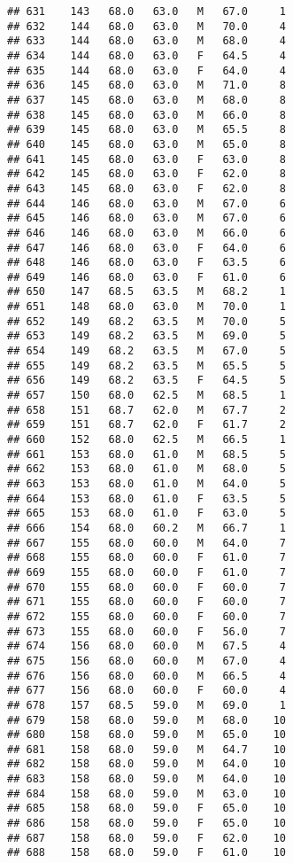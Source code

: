 \documentclass[
]{article}
\begin{document}
\begin{verbatim}
## 631    143   68.0   63.0   M   67.0     1
## 632    144   68.0   63.0   M   70.0     4
## 633    144   68.0   63.0   M   68.0     4
## 634    144   68.0   63.0   F   64.5     4
## 635    144   68.0   63.0   F   64.0     4
## 636    145   68.0   63.0   M   71.0     8
## 637    145   68.0   63.0   M   68.0     8
## 638    145   68.0   63.0   M   66.0     8
## 639    145   68.0   63.0   M   65.5     8
## 640    145   68.0   63.0   M   65.0     8
## 641    145   68.0   63.0   F   63.0     8
## 642    145   68.0   63.0   F   62.0     8
## 643    145   68.0   63.0   F   62.0     8
## 644    146   68.0   63.0   M   67.0     6
## 645    146   68.0   63.0   M   67.0     6
## 646    146   68.0   63.0   M   66.0     6
## 647    146   68.0   63.0   F   64.0     6
## 648    146   68.0   63.0   F   63.5     6
## 649    146   68.0   63.0   F   61.0     6
## 650    147   68.5   63.5   M   68.2     1
## 651    148   68.0   63.0   M   70.0     1
## 652    149   68.2   63.5   M   70.0     5
## 653    149   68.2   63.5   M   69.0     5
## 654    149   68.2   63.5   M   67.0     5
## 655    149   68.2   63.5   M   65.5     5
## 656    149   68.2   63.5   F   64.5     5
## 657    150   68.0   62.5   M   68.5     1
## 658    151   68.7   62.0   M   67.7     2
## 659    151   68.7   62.0   F   61.7     2
## 660    152   68.0   62.5   M   66.5     1
## 661    153   68.0   61.0   M   68.5     5
## 662    153   68.0   61.0   M   68.0     5
## 663    153   68.0   61.0   M   64.0     5
## 664    153   68.0   61.0   F   63.5     5
## 665    153   68.0   61.0   F   63.0     5
## 666    154   68.0   60.2   M   66.7     1
## 667    155   68.0   60.0   M   64.0     7
## 668    155   68.0   60.0   F   61.0     7
## 669    155   68.0   60.0   F   61.0     7
## 670    155   68.0   60.0   F   60.0     7
## 671    155   68.0   60.0   F   60.0     7
## 672    155   68.0   60.0   F   60.0     7
## 673    155   68.0   60.0   F   56.0     7
## 674    156   68.0   60.0   M   67.5     4
## 675    156   68.0   60.0   M   67.0     4
## 676    156   68.0   60.0   M   66.5     4
## 677    156   68.0   60.0   F   60.0     4
## 678    157   68.5   59.0   M   69.0     1
## 679    158   68.0   59.0   M   68.0    10
## 680    158   68.0   59.0   M   65.0    10
## 681    158   68.0   59.0   M   64.7    10
## 682    158   68.0   59.0   M   64.0    10
## 683    158   68.0   59.0   M   64.0    10
## 684    158   68.0   59.0   M   63.0    10
## 685    158   68.0   59.0   F   65.0    10
## 686    158   68.0   59.0   F   65.0    10
## 687    158   68.0   59.0   F   62.0    10
## 688    158   68.0   59.0   F   61.0    10

\end{verbatim}
\end{document}

